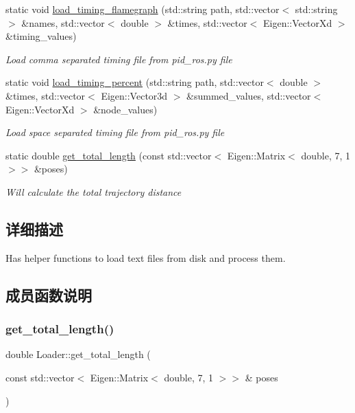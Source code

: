 \begin{DoxyCompactItemize}
static void \hyperlink{classov__eval_1_1Loader_aef2c74f0ad3dc52f0ce47bfe22ae6ed4}{load\+\_\+timing\+\_\+flamegraph} (std\+::string path, std\+::vector$<$ std\+::string $>$ \&names, std\+::vector$<$ double $>$ \&times, std\+::vector$<$ Eigen\+::\+Vector\+Xd $>$ \&timing\+\_\+values)
\begin{DoxyCompactList}\small\item\em Load {\itshape comma} separated timing file from pid\+\_\+ros.\+py file \end{DoxyCompactList}\item 
static void \hyperlink{classov__eval_1_1Loader_aebb4fa55e3b3c9399dfebe11fe940112}{load\+\_\+timing\+\_\+percent} (std\+::string path, std\+::vector$<$ double $>$ \&times, std\+::vector$<$ Eigen\+::\+Vector3d $>$ \&summed\+\_\+values, std\+::vector$<$ Eigen\+::\+Vector\+Xd $>$ \&node\+\_\+values)
\begin{DoxyCompactList}\small\item\em Load space separated timing file from pid\+\_\+ros.\+py file \end{DoxyCompactList}\item 
static double \hyperlink{classov__eval_1_1Loader_af4f3f47d194febe39fe1a97a915b7add}{get\+\_\+total\+\_\+length} (const std\+::vector$<$ Eigen\+::\+Matrix$<$ double, 7, 1 $>$$>$ \&poses)
\begin{DoxyCompactList}\small\item\em Will calculate the total trajectory distance \end{DoxyCompactList}\end{DoxyCompactItemize}


\subsection{详细描述}
Has helper functions to load text files from disk and process them. 

\subsection{成员函数说明}
\mbox{\label{classov__eval_1_1Loader_af4f3f47d194febe39fe1a97a915b7add}} 
\subsubsection{\texorpdfstring{get\+\_\+total\+\_\+length()}{get\_total\_length()}}
{\footnotesize\ttfamily double Loader\+::get\+\_\+total\+\_\+length (\begin{DoxyParamCaption}\item[{const std\+::vector$<$ Eigen\+::\+Matrix$<$ double, 7, 1 $>$$>$ \&}]{poses }\end{DoxyParamCaption})\hspace{0.3cm}{\ttfamily [static]}}



